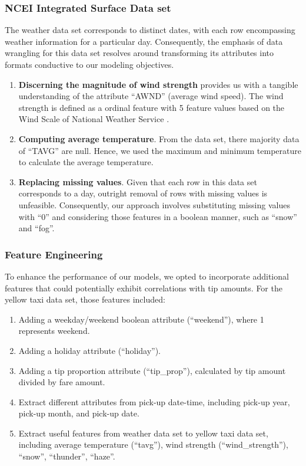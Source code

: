 \documentclass[11pt]{article}
\begin{document}
\subsubsection{NCEI Integrated Surface Data set}
The weather data set corresponds to distinct dates, with each row encompassing weather information for a particular day. Consequently, the emphasis of data wrangling for this data set resolves around transforming its attributes into formats conductive to our modeling objectives.
\begin{enumerate}
    \item \textbf{Discerning the magnitude of wind strength} provides us with a tangible understanding of the attribute ``AWND'' (average wind speed). The wind strength is defined as a ordinal feature with 5 feature values based on the Wind Scale of National Weather Service \cite{wind}. 
    \item \textbf{Computing average temperature}. From the data set, there majority data of ``TAVG'' are null. Hence, we used the maximum and minimum temperature to calculate the average temperature.
    \item \textbf{Replacing missing values}. Given that each row in this data set corresponds to a day, outright removal of rows with missing values is unfeasible. Consequently, our approach involves substituting missing values with ``0'' and considering those features in a boolean manner, such as ``snow'' and ``fog''.
\end{enumerate}
\subsubsection{Feature Engineering}
To enhance the performance of our models, we opted to incorporate additional features that could potentially exhibit correlations with tip amounts. For the yellow taxi data set, those features included: \\
\begin{enumerate}
    \item Adding a weekday/weekend boolean attribute (``weekend''), where 1 represents weekend.
    \item Adding a holiday attribute (``holiday'').
    \item Adding a tip proportion attribute (``tip\_prop''), calculated by tip amount divided by fare amount. 
    \item Extract different attributes from pick-up date-time, including pick-up year, pick-up month, and pick-up date.
    \item Extract useful features from weather data set to yellow taxi data set, including average temperature (``tavg''), wind strength (``wind\_strength''), ``snow'', ``thunder'', ``haze''.
\end{enumerate}
\end{document}
